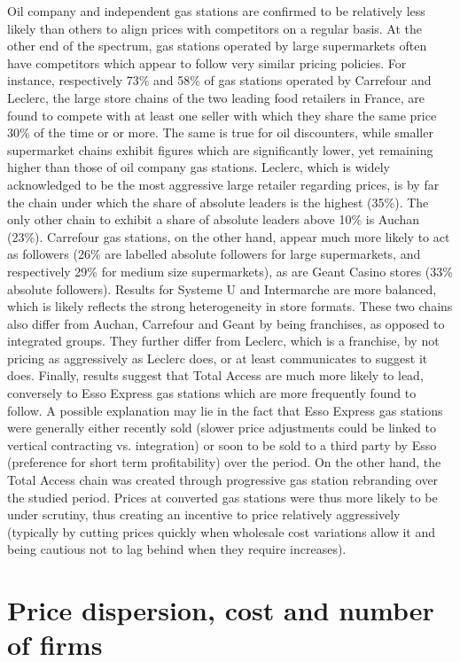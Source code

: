 \documentclass[english]{article}
\begin{document}
Oil company and independent gas stations are confirmed to be relatively less likely than others to align prices with competitors on a regular basis. At the other end of the spectrum, gas stations operated by large supermarkets often have competitors which appear to follow very similar pricing policies. For instance, respectively 73\% and 58\% of gas stations operated by Carrefour and Leclerc, the large store chains of the two leading food retailers in France, are found to compete with at least one seller with which they share the same price 30\% of the time or or more. The same is true for oil discounters, while smaller supermarket chains exhibit figures which are significantly lower, yet remaining higher than those of oil company gas stations.
Leclerc, which is widely acknowledged to be the most aggressive large retailer regarding prices, is by far the chain under which the share of absolute leaders is the highest (35\%). The only other chain to exhibit a share of absolute leaders above 10\% is Auchan (23\%). Carrefour gas stations, on the other hand, appear much more likely to act as followers (26\% are labelled absolute followers for large supermarkets, and respectively 29\% for medium size supermarkets), as are Geant Casino stores (33\% absolute followers). Results for Systeme U and Intermarche are more balanced, which is likely reflects the strong heterogeneity in store formats. These two chains also differ from Auchan, Carrefour and Geant by being franchises, as opposed to integrated groups. They further differ from Leclerc, which is a franchise, by not pricing as aggressively as Leclerc does, or at least communicates to suggest it does. Finally, results suggest that Total Access are much more likely to lead, conversely to Esso Express gas stations which are more frequently found to follow. A possible explanation may lie in the fact that Esso Express gas stations were generally either recently sold (slower price adjustments could be linked to vertical contracting vs. integration) or soon to be sold to a third party by Esso (preference for short term profitability) over the period. On the other hand, the Total Access chain was created through progressive gas station rebranding over the studied period. Prices at converted gas stations were thus more likely to be under scrutiny, thus creating an incentive to price relatively aggressively (typically by cutting prices quickly when wholesale cost variations allow it and being cautious not to lag behind when they require increases).

\section{Price dispersion, cost and number of firms}
\end{document}
